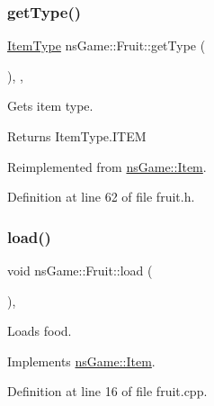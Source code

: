 \subsubsection{\texorpdfstring{get\+Type()}{getType()}}
{\footnotesize\ttfamily \hyperlink{namespacens_game_a5f7db01e6447720e9a145f0b3c68a4d7}{Item\+Type} ns\+Game\+::\+Fruit\+::get\+Type (\begin{DoxyParamCaption}{ }\end{DoxyParamCaption})\hspace{0.3cm}{\ttfamily [inline]}, {\ttfamily [override]}, {\ttfamily [virtual]}}



Gets item type. 

\begin{DoxyReturn}{Returns}
Item\+Type.\+I\+T\+EM 
\end{DoxyReturn}


Reimplemented from \hyperlink{structns_game_1_1_item_a69156550e5083928cbb673ca2db671f5}{ns\+Game\+::\+Item}.



Definition at line 62 of file fruit.\+h.

\mbox{\label{classns_game_1_1_fruit_a28c4ae21607dbad699602528c6ffc583}} 
\subsubsection{\texorpdfstring{load()}{load()}}
{\footnotesize\ttfamily void ns\+Game\+::\+Fruit\+::load (\begin{DoxyParamCaption}{ }\end{DoxyParamCaption})\hspace{0.3cm}{\ttfamily [override]}, {\ttfamily [virtual]}}



Loads food. 



Implements \hyperlink{structns_game_1_1_item_a5887b6e9225ae8a276801225eca83808}{ns\+Game\+::\+Item}.



Definition at line 16 of file fruit.\+cpp.

